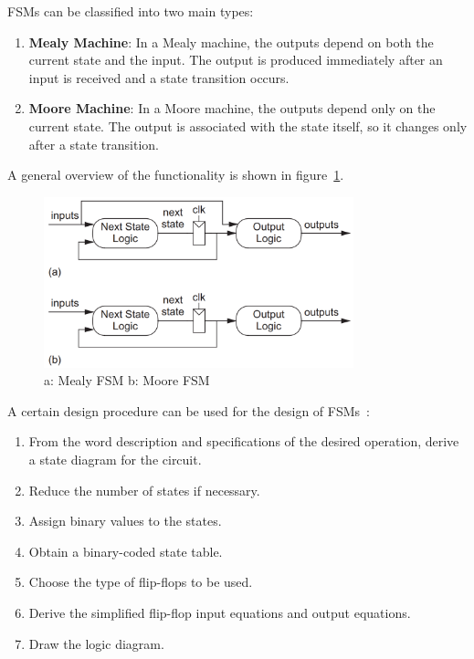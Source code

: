 \noindent
FSMs can be classified into two main types:

\begin{enumerate}
    \item \textbf{Mealy Machine}: In a Mealy machine, the outputs depend on both the current state and the input. The output is produced immediately after an input is received and a state transition occurs. 
    
    \item \textbf{Moore Machine}: In a Moore machine, the outputs depend only on the current state. The output is associated with the state itself, so it changes only after a state transition.
\end{enumerate}

A general overview of the functionality is shown in figure~\ref{fig:general_fsm}.

\begin{figure}[H]
    \centering
    \includegraphics[width=0.8\textwidth]{Figures/general fsm diagrams.png}
    \caption{a: Mealy FSM b: Moore FSM \cite{CMOS_VLSI_design}}
    \label{fig:general_fsm}
\end{figure}


\noindent
A certain design procedure can be used for the design of FSMs~\cite{digital_design}:

\begin{enumerate}
  \item From the word description and specifications of the desired operation, derive a state diagram for the circuit.
  \item Reduce the number of states if necessary.
  \item Assign binary values to the states.
  \item Obtain a binary-coded state table.
  \item Choose the type of flip-flops to be used.
  \item Derive the simplified flip-flop input equations and output equations.
  \item Draw the logic diagram.
\end{enumerate}


